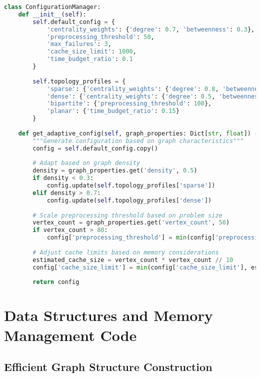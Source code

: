 \begin{lstlisting}[language=Python, caption=Adaptive Configuration Management]
class ConfigurationManager:
    def __init__(self):
        self.default_config = {
            'centrality_weights': {'degree': 0.7, 'betweenness': 0.3},
            'preprocessing_threshold': 50,
            'max_failures': 3,
            'cache_size_limit': 1000,
            'time_budget_ratio': 0.1
        }
        
        self.topology_profiles = {
            'sparse': {'centrality_weights': {'degree': 0.8, 'betweenness': 0.2}},
            'dense': {'centrality_weights': {'degree': 0.5, 'betweenness': 0.5}},
            'bipartite': {'preprocessing_threshold': 100},
            'planar': {'time_budget_ratio': 0.15}
        }
    
    def get_adaptive_config(self, graph_properties: Dict[str, float]) -> Dict[str, Any]:
        """Generate configuration based on graph characteristics"""
        config = self.default_config.copy()
        
        # Adapt based on graph density
        density = graph_properties.get('density', 0.5)
        if density < 0.3:
            config.update(self.topology_profiles['sparse'])
        elif density > 0.7:
            config.update(self.topology_profiles['dense'])
        
        # Scale preprocessing threshold based on problem size
        vertex_count = graph_properties.get('vertex_count', 50)
        if vertex_count > 80:
            config['preprocessing_threshold'] = min(config['preprocessing_threshold'], vertex_count // 2)
        
        # Adjust cache limits based on memory considerations
        estimated_cache_size = vertex_count * vertex_count // 10
        config['cache_size_limit'] = min(config['cache_size_limit'], estimated_cache_size)
        
        return config
\end{lstlisting}

\section{Data Structures and Memory Management Code}

\subsection{Efficient Graph Structure Construction}
\label{appendix:graph-construction}

